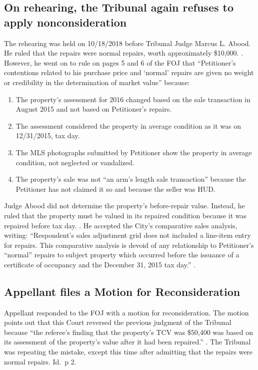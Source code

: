 \documentclass[12pt,\documentclassflag]{michiganCourtOfAppealsBrief}
\begin{document}
\subsection{On rehearing, the Tribunal again refuses to apply nonconsideration}

The rehearing was held on 10/18/2018 before Tribunal Judge Marcus L. Abood. He ruled that the repairs were normal repairs, worth approximately \$10,000. \foj[4]. However, he went on to rule on pages 5 and 6 of the FOJ that ``Petitioner's contentions related to his purchase price and `normal' repairs are given no weight or credibility in the determination of market value'' because:
\begin{enumerate}
\item The property's assessment for 2016 changed based on the sale transaction in August 2015 and not based on Petitioner's repairs. 
\item The assessment considered the property in average condition as it was on 12/31/2015, tax day.
\item The MLS photographs submitted by Petitioner show the property in average condition, not neglected or vandalized.
\item The property's sale was not ``an arm's length sale transaction'' because the Petitioner has not claimed it so and because the seller was HUD.
\end{enumerate}

Judge Abood did not determine the property's before-repair value. Instead, he ruled that the property must be valued in its repaired condition because it was repaired before tax day. \foj[5]. He accepted the City's comparative sales analysis, writing: ``Respondent's sales adjustment grid does not included a line-item entry for repairs. This comparative analysis is devoid of any relationship to Petitioner's ``normal'' repairs to subject property which occurred before the issuance of a certificate of occupancy and the December 31, 2015 tax day.'' \foj[6].

\subsection{Appellant files a Motion for Reconsideration}

Appellant responded to the FOJ with a motion for reconsideration. The motion points out that this Court reversed the previous judgment of the Tribunal because  ``the referee's finding that the property's TCV was \$50,400 was based on its assessment of the property's value after it had been repaired.'' \motionForReconsideration[1]. The Tribunal was repeating the mistake, except this time after admitting that the repairs were normal repairs. Id.\ p 2. 
\end{document}
